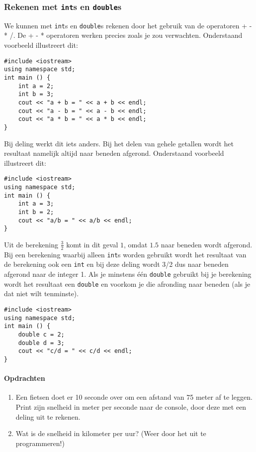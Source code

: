 \documentclass[12pt,a4paper]{article}
\newcommand{\icode}{\lstinline}
\begin{document}
\subsubsection{Rekenen met \icode{int}s en \icode{double}s}

We kunnen met \icode{int}s en \icode{double}s rekenen door het gebruik van de operatoren + - * /. 
De + - * operatoren werken precies zoals je zou verwachten. Onderstaand voorbeeld illustreert dit: 
\begin{lstlisting}
#include <iostream> 
using namespace std; 
int main () {
	int a = 2; 
	int b = 3; 
	cout << "a + b = " << a + b << endl; 
	cout << "a - b = " << a - b << endl; 
	cout << "a * b = " << a * b << endl; 
}
\end{lstlisting}
Bij deling werkt dit iets anders. Bij het delen van gehele getallen wordt het resultaat namelijk altijd naar beneden afgerond. 
Onderstaand voorbeeld illustreert dit: 
\begin{lstlisting}
#include <iostream> 
using namespace std; 
int main () {
	int a = 3; 
	int b = 2; 
	cout << "a/b = " << a/b << endl; 
}
\end{lstlisting}
Uit de berekening $\frac 32$ komt in dit geval $1$, omdat $1.5$ naar beneden wordt afgerond. Bij een 
berekening waarbij alleen \icode{int}s worden gebruikt wordt het resultaat van de berekening ook 
een \icode{int} en bij deze deling wordt 3/2 dus naar beneden afgerond naar de integer 1. Als je minstens 
één \icode{double} gebruikt bij je berekening wordt het resultaat een \icode{double} en voorkom je 
die afronding naar beneden (als je dat niet wilt tenminste). 
\begin{lstlisting}
#include <iostream> 
using namespace std; 
int main () {
	double c = 2; 
	double d = 3; 
	cout << "c/d = " << c/d << endl; 
}
\end{lstlisting}

\paragraph{Opdrachten}
\begin{enumerate}
\item
	Een fietsen doet er 10 seconde over om een afstand van 75 meter af te leggen. Print zijn snelheid in meter per seconde naar de console, door deze met een deling uit te rekenen.
\item 
	Wat is de snelheid in kilometer per uur? (Weer door het uit te programmeren!)
\end{enumerate} 
\end{document}
